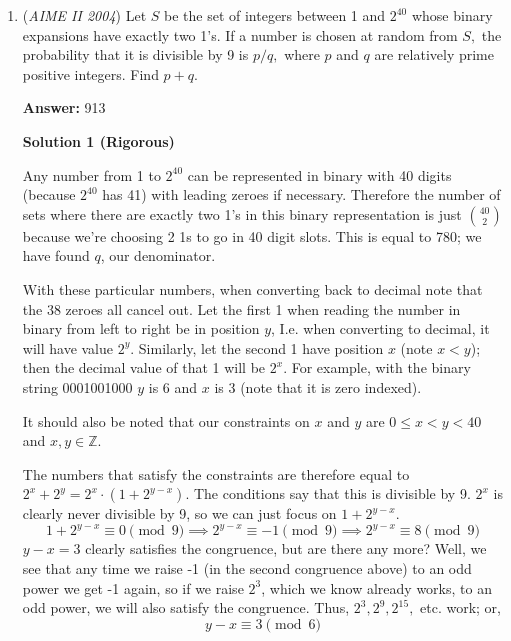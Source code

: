 \begin{enumerate}
 



\textbf{Solution 4 (quadratic)}

Let $a_2 = x$. We will write the first 10 terms in terms of $x$ (this will require some rigorous polynomial division):

 


	\item (\textit{AIME II 2004}) Let $S$ be the set of integers between 1 and $2^{40}$ whose binary expansions have exactly two 1's. If a number is chosen at random from $S,$ the probability that it is divisible by 9 is $p/q,$ where $p$ and $q$ are relatively prime positive integers. Find $p+q.$

 \textbf{Answer: }913



\textbf{Solution 1 (Rigorous)}

Any number from 1 to $2^{40}$ can be represented in binary with 40 digits (because $2^{40}$ has 41) with leading zeroes if necessary. Therefore the number of sets where there are exactly two 1’s in this binary representation is just $\binom {40}{2}$ because we’re choosing 2 1s to go in 40 digit slots. This is equal to 780; we have found $q$, our denominator.

 With these particular numbers, when converting back to decimal note that the 38 zeroes all cancel out. Let the first 1 when reading the number in binary from left to right be in position $y$, I.e. when converting to decimal, it will have value $2^{y}$. Similarly, let the second 1 have position $x$ (note $x<y$); then the decimal value of that 1 will be $2^{x}$. For example, with the binary string 0001001000 $y$ is 6 and $x$ is 3 (note that it is zero indexed).

 It should also be noted that our constraints on $x$ and $y$ are $0 \leq x < y < 40$ and $x, y \in \mathbb{Z}$.

 The numbers that satisfy the constraints are therefore equal to $2^{x}+2^{y} = 2^{x} \cdot (1+2^{y-x})$. The conditions say that this is divisible by 9. $2^{x}$ is clearly never divisible by 9, so we can just focus on $1+2^{y-x}$. 
 \[1+2^{y-x} \equiv 0 \pmod 9 \implies 2^{y-x} \equiv -1 \pmod 9 \implies 2^{y-x} \equiv 8 \pmod 9\]
$y-x = 3$ clearly satisfies the congruence, but are there any more? Well, we see that any time we raise -1 (in the second congruence above) to an odd power we get -1 again, so if we raise $2^{3}$, which we know already works, to an odd power, we will also satisfy the congruence. Thus, $2^{3}, 2^{9}, 2^{15},$ etc. work; or, 
 \[y-x \equiv 3 \pmod 6\]


\end{enumerate}
